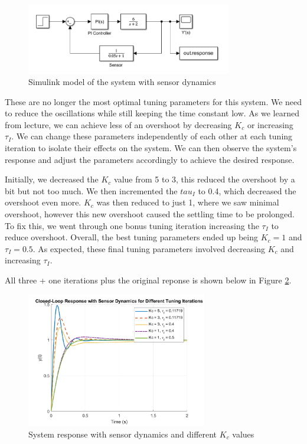 \documentclass[12pt]{article}
\begin{document}
\begin{enumerate}
\begin{enumerate}
    \begin{figure}[H]
      \centering
      \includegraphics[width=0.8\textwidth]{Figures/Models/model1_14.png}
      \caption{Simulink model of the system with sensor dynamics}
      \label{fig:figure1_15}
    \end{figure}

    These are no longer the most optimal tuning parameters for this system. We need to reduce the oscillations while still keeping the time constant low. As we learned from lecture, we can achieve less of an overshoot by decreasing $K_c$ or increasing $\tau_I$. We can change these parameters independently of each other at each tuning iteration to isolate their effects on the system. We can then observe the system's response and adjust the parameters accordingly to achieve the desired response. \linebreak

    Initially, we decreased the $K_c$ value from 5 to 3, this reduced the overshoot by a bit but not too much. We then incremented the $tau_I$ to 0.4, which decreased the overshoot even more. $K_c$ was then reduced to just 1, where we saw minimal overshoot, however this new overshoot caused the settling time to be prolonged. To fix this, we went through one bonus tuning iteration increasing the $\tau_I$ to reduce overshoot. Overall, the best tuning parameters ended up being $K_c = 1$ and $\tau_I = 0.5$. As expected, these final tuning parameters involved decreasing $K_c$ and increasing $\tau_I$.
    
    All three + one iterations plus the original reponse is shown below in Figure \ref{fig:figure1_16}. 

    \begin{figure}[H]
      \centering
      \includegraphics[width=0.7\textwidth]{Figures/figure1_15.png}
      \caption{System response with sensor dynamics and different $K_c$ values}
      \label{fig:figure1_16}
    \end{figure}


\end{enumerate}
\end{enumerate}
\end{document}
